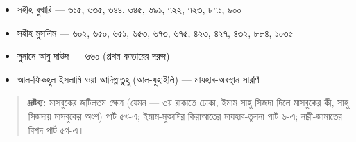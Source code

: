 \begin{itemize}
\item সহীহ বুখারি — ৬১৫, ৬৩৫, ৬৪৪, ৬৪৫, ৬৯১, ৭২২, ৭২৩, ৮৭১, ৯০০
\item সহীহ মুসলিম — ৬০২, ৬৫০, ৬৫১, ৬৫৩, ৬৭৩, ৬৭৫, ৪২৩, ৪২৭, ৪৩২, ৮৮৪, ১০৩৫
\item সুনানে আবু দাউদ — ৬৬০ (প্রথম কাতারের দরুদ)
\item আল-ফিকহুল ইসলামি ওয়া আদিল্লাতুহু (আল-যুহাইলি) — মাযহাব-অবস্থান সারণি
\end{itemize}
\begin{quote}
\textbf{দ্রষ্টব্য:} মাসবুকের জটিলতম ক্ষেত্র (যেমন — ৩য় রাকাতে ঢোকা, ইমাম সাহু সিজদা দিলে মাসবুকের কী, সাহু সিজদায় মাসবুকের অংশ) পার্ট ৫খ-এ; ইমাম-মুক্তাদির কিরাআতের মাযহাব-তুলনা পার্ট ৬-এ; নারী-জামাতের বিশদ পার্ট ৫গ-এ।
\end{quote}


